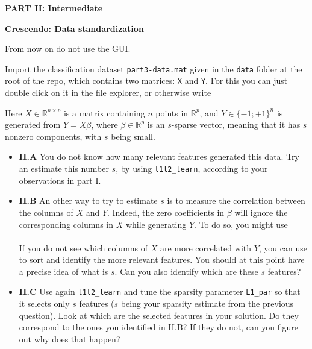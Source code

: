 \documentclass[DIN, pagenumber=false, fontsize=11pt, parskip=half]{scrartcl}
\newcommand{\mysection}[1]{\noindent\large\textbf{#1}}
\begin{document}
\begin{center}
\large\textbf{PART II: Intermediate}
\end{center}

\mysection{Crescendo: Data standardization}

From now on do not use the GUI.

Import the classification dataset \texttt{part3-data.mat} given in the \texttt{data} folder at the root of the repo, which contains two matrices: \texttt{X} and \texttt{Y}.
For this you can just double click on it in the file explorer, or otherwise write\\

Here $X \in \mathbb{R}^{n \times p}$ is a matrix containing $n$ points in $\mathbb{R}^p$, and $Y \in \{-1;+1\}^n$ is generated from $Y=X \beta$, where $\beta \in \mathbb{R}^p$ is an $s$-sparse vector, meaning that it has $s$ nonzero components, with $s$ being small.

\begin{itemize}
  \item \textbf{II.A} You do not know how many relevant features generated this data.
  Try an estimate this number $s$, by using \texttt{l1l2\_learn}, according to your observations in part I.

  \item \textbf{II.B} An other way to try to estimate $s$ is to measure the correlation between the columns of $X$ and $Y$.
  Indeed, the zero coefficients in $\beta$ will ignore the corresponding columns in $X$ while generating $Y$.
  To do so, you might use\\
  \\
  If you do not see which columns of $X$ are more correlated with $Y$, you can use  to sort and identify the more relevant features.
You should at this point have a precise idea of what is $s$.
Can you also identify which are these $s$ features?

  \item \textbf{II.C} Use again \texttt{l1l2\_learn} and tune the sparsity parameter \texttt{L1\_par} so that it selects only $s$ features ($s$ being your sparsity estimate from the previous question).
  Look at which are the selected features in your solution.
  Do they correspond to the ones you identified in II.B?
  If they do not, can you figure out why does that happen?\\
\end{itemize}
\end{document}
